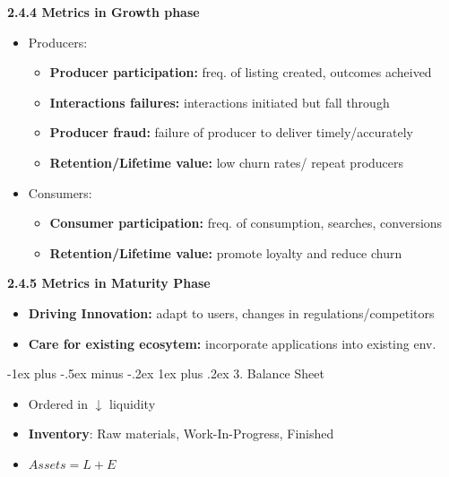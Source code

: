 \documentclass[10pt,landscape]{article}
\makeatletter
\renewcommand{\subsubsection}{\@startsection{subsubsection}{3}{0mm}%
                                {-1ex plus -.5ex minus -.2ex}%
                                {1ex plus .2ex}%
                                {\normalfont\small\bfseries}}
\makeatother
\begin{document}
\begin{multicols*}{3}
\textbf{2.4.4 Metrics in Growth phase}
\begin{itemize}[topsep=0pt,noitemsep,wide=0pt, leftmargin=\dimexpr{} + 2\relax]
    \item Producers:
    \begin{itemize}[topsep=0pt,noitemsep,wide=0pt, leftmargin=\dimexpr{} + 2\relax]
        \item \textbf{Producer participation:} freq. of listing created, outcomes acheived
        \item \textbf{Interactions failures:} interactions initiated but fall through
        \item \textbf{Producer fraud:} failure of producer to deliver timely/accurately
        \item \textbf{Retention/Lifetime value:} low churn rates/ repeat producers
    \end{itemize}
    \item Consumers:
    \begin{itemize}[topsep=0pt,noitemsep,wide=0pt, leftmargin=\dimexpr{} + 2\relax]
        \item \textbf{Consumer participation:} freq. of consumption, searches, conversions
        \item \textbf{Retention/Lifetime value:} promote loyalty and reduce churn
    \end{itemize}
\end{itemize}

\textbf{2.4.5 Metrics in Maturity Phase}
\begin{itemize}[topsep=0pt,noitemsep,wide=0pt, leftmargin=\dimexpr{} + 2\relax]
    \item \textbf{Driving Innovation:} adapt to users, changes in regulations/competitors
    \item \textbf{Care for existing ecosytem:} incorporate applications into existing env.
\end{itemize}

\subsubsection{3. Balance Sheet}
\begin{multicols}{2}
    \begin{itemize}[topsep=0pt, noitemsep, wide=0pt, leftmargin=\dimexpr{} + 1\relax]
        \item Ordered in $\downarrow$ liquidity
        \item \textbf{Inventory}: Raw materials, Work-In-Progress, Finished
        \item $Assets = L + E$
    \end{itemize}
    

\end{multicols}
\end{multicols*}
\end{document}
